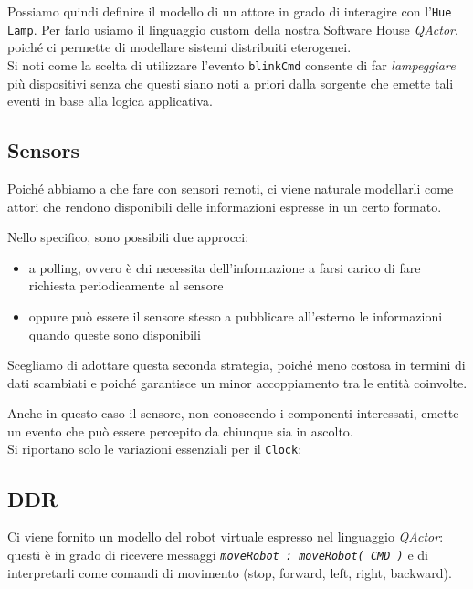 \documentclass{../llncs}
\newcommand{\qa}{\textsf{\textit{QActor}}}
\begin{document}
Possiamo quindi definire il modello di un attore in grado di interagire con l'\texttt{Hue Lamp}. Per farlo usiamo il linguaggio custom della nostra Software House \qa, poiché ci permette di modellare sistemi distribuiti eterogenei.\\



Si noti come la scelta di utilizzare l'evento \texttt{blinkCmd} consente di far \textit{lampeggiare} più dispositivi senza che questi siano noti a priori dalla sorgente che emette tali eventi in base alla logica applicativa.

\subsection{Sensors}
Poiché abbiamo a che fare con sensori remoti, ci viene naturale modellarli come attori che rendono disponibili delle informazioni espresse in un certo formato.

Nello specifico, sono possibili due approcci:
\begin{itemize}
\item a polling, ovvero è chi necessita dell'informazione a farsi carico di fare richiesta periodicamente al sensore
\item oppure può essere il sensore stesso a pubblicare all'esterno le informazioni quando queste sono disponibili 
\end{itemize}
Scegliamo di adottare questa seconda strategia, poiché meno costosa in termini di dati scambiati e poiché garantisce un minor accoppiamento tra le entità coinvolte.

Anche in questo caso il sensore, non conoscendo i componenti interessati, emette un evento che può essere percepito da chiunque sia in ascolto.\\



Si riportano solo le variazioni essenziali per il \texttt{Clock}:



\subsection{DDR}
Ci viene fornito un modello del robot virtuale espresso nel linguaggio \qa: questi è in grado di ricevere messaggi \texttt{\textit{moveRobot : moveRobot( CMD )}} e di interpretarli come comandi di movimento (stop, forward, left, right, backward).
\end{document}
